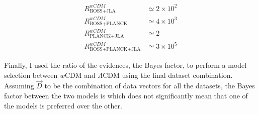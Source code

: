\begin{align}
R_{\scriptscriptstyle\text{BOSS+JLA}}^{\textit{w}CDM} & \simeq 2 \times 10^2  \\
R_{\scriptscriptstyle\text{BOSS+PLANCK}}^{\textit{w}CDM} & \simeq 4 \times 10^3 \\
R_{\scriptscriptstyle\text{PLANCK+JLA}}^{\textit{w}CDM} & \simeq 2 \\
R_{\scriptscriptstyle\text{BOSS+PLANCK+JLA}}^{\textit{w}CDM} & \simeq 3 \times 10^5
\end{align}

Finally, I used the ratio of the evidences, the Bayes factor, to perform a model selection between $w$CDM and $\Lambda$CDM using the final dataset combination. Assuming $\vec{D}$ to be the combination of data vectors for all the datasets, the Bayes factor between the two models is
which does not significantly mean that one of the models is preferred over the other.


